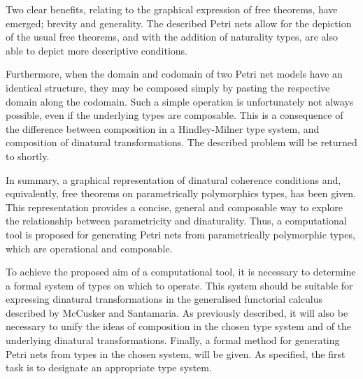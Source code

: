 \documentclass[../../Reflection.tex]{subfiles}
\begin{document}
Two clear benefits, relating to the graphical expression of free theorems, have emerged; brevity and generality. The described Petri nets allow for the depiction of the usual free theorems, and with the addition of naturality types, are also able to depict more descriptive conditions. 
\par
Furthermore, when the domain and codomain of two Petri net models have an identical structure, they may be composed simply by pasting the respective domain along the codomain. Such a simple operation is unfortunately not always possible, even if the underlying types are composable. This is a consequence of the difference between composition in a Hindley-Milner type system, and composition of dinatural transformations. The described problem will be returned to shortly.
\par
In summary, a graphical representation of dinatural coherence conditions and, equivalently, free theorems on parametrically polymorphics types, has been given. This representation provides  a concise, general and composable way to explore the relationship between parametricity and dinaturality. Thus, a computational tool is proposed for generating Petri nets from parametrically polymorphic types, which are operational and composable. 
\par
To achieve the proposed aim of a computational tool, it is necessary to determine a formal system of types on which to operate. This system should be suitable for expressing dinatural transformations in the generalised functorial calculus described by McCusker and Santamaria. As previously described, it will also be necessary to unify the ideas of composition in the chosen type system and of the underlying dinatural transformations. Finally, a formal method for generating Petri nets from types in the chosen system, will be given. As specified, the first task is to designate an appropriate type system.
\end{document}
